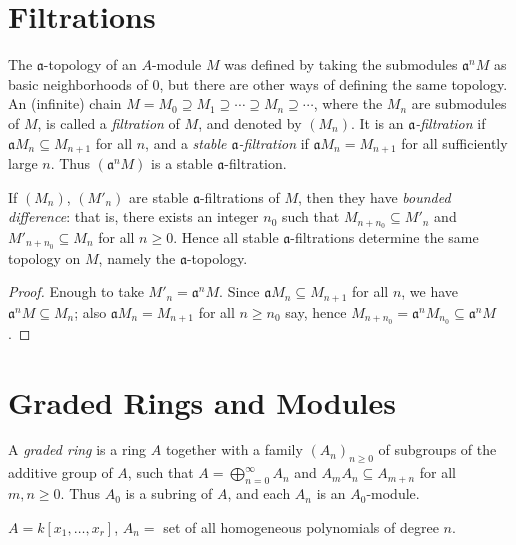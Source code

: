 \section*{Filtrations}
The $\mathfrak{a}$-topology of an $A$-module $M$ was defined by taking the submodules $\mathfrak{a}^n M$ as basic neighborhoods of $0$, but there are other ways of defining the same topology. An (infinite) chain $M = M_0 \supseteq M_1 \supseteq \cdots \supseteq M_n \supseteq \cdots$, where the $M_n$ are submodules of $M$, is called a \emph{filtration} of $M$, and denoted by $(M_n)$. It is an \emph{$\mathfrak{a}$-filtration} if $\mathfrak{a} M_n \subseteq M_{n+1}$ for all $n$, and a \emph{stable $\mathfrak{a}$-filtration} if $\mathfrak{a} M_n = M_{n+1}$ for all sufficiently large $n$. Thus $(\mathfrak{a}^n M)$ is a stable $\mathfrak{a}$-filtration.

\begin{lemma}\label{lem:stable-filtration-bounded}
If $(M_n)$, $(M'_n)$ are stable $\mathfrak{a}$-filtrations of $M$, then they have \emph{bounded difference}: that is, there exists an integer $n_0$ such that $M_{n+n_0} \subseteq M'_n$ and $M'_{n+n_0} \subseteq M_n$ for all $n \geq 0$. Hence all stable $\mathfrak{a}$-filtrations determine the same topology on $M$, namely the $\mathfrak{a}$-topology.
\end{lemma}

\begin{proof}
Enough to take $M'_n = \mathfrak{a}^n M$. Since $\mathfrak{a} M_n \subseteq M_{n+1}$ for all $n$, we have $\mathfrak{a}^n M \subseteq M_n$; also $\mathfrak{a} M_n = M_{n+1}$ for all $n \geq n_0$ say, hence $M_{n+n_0} = \mathfrak{a}^n M_{n_0} \subseteq \mathfrak{a}^n M$.
\end{proof}

\section*{Graded Rings and Modules}
A \emph{graded ring} is a ring $A$ together with a family $(A_n)_{n \geq 0}$ of subgroups of the additive group of $A$, such that $A = \bigoplus_{n=0}^\infty A_n$ and $A_m A_n \subseteq A_{m+n}$ for all $m, n \geq 0$. Thus $A_0$ is a subring of $A$, and each $A_n$ is an $A_0$-module.

\begin{example}
$A = k[x_1, \ldots, x_r]$, $A_n = $ set of all homogeneous polynomials of degree $n$.
\end{example}

